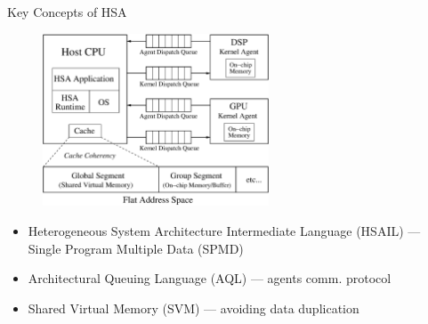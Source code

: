 \documentclass[handout]{beamer}
\begin{document}
\begin{CJK}{UTF8}{bkai}
            \begin{frame}{Key Concepts of HSA}
                \vspace{-1em}
                \begin{figure}[!ht]
                    \centering
                    \includegraphics[width=0.6\textwidth]{./figs/systemspec.eps}
                    \label{fig:systemspec}
                \end{figure}
                \vspace{-1em}
                \begin{itemize}
                    \pause
                    \item Heterogeneous System Architecture Intermediate Language (HSAIL) --- Single Program Multiple Data (SPMD) 
                    \pause
                    \item Architectural Queuing Language (AQL) --- agents comm. protocol
                    \pause
                    \item Shared Virtual Memory (SVM) --- avoiding data duplication
                \end{itemize}
            \end{frame}


\end{CJK}
\end{document}

